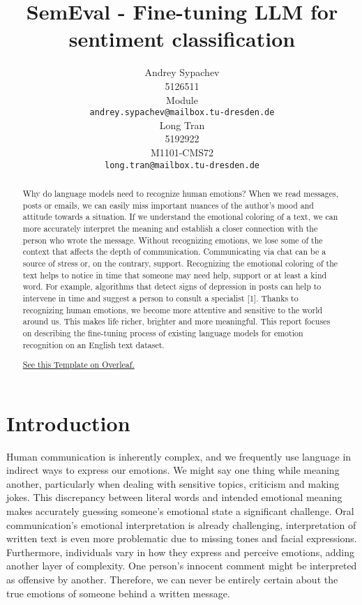\documentclass[11pt]{article}
\title{SemEval - Fine-tuning LLM for sentiment classification}
\author{Andrey Sypachev \\
  5126511\\
  Module \\
  \texttt{andrey.sypachev@mailbox.tu-dresden.de} 
  \\\And
  Long Tran \\
  5192922\\
  M1101-CMS72 \\
  \texttt{long.tran@mailbox.tu-dresden.de} 
  \\}
\begin{document}
\maketitle
\begin{abstract}
Why do language models need to recognize human emotions?
When we read messages, posts or emails, we can easily miss important nuances of the author's mood and attitude towards a situation. If we understand the emotional coloring of a text, we can more accurately interpret the meaning and establish a closer connection with the person who wrote the message. Without recognizing emotions, we lose some of the context that affects the depth of communication. Communicating via chat can be a source of stress or, on the contrary, support. Recognizing the emotional coloring of the text helps to notice in time that someone may need help, support or at least a kind word. For example, algorithms that detect signs of depression in posts can help to intervene in time and suggest a person to consult a specialist [1]. Thanks to recognizing human emotions, we become more attentive and sensitive to the world around us. This makes life richer, brighter and more meaningful.
This report focuses on describing the fine-tuning process of existing language models for emotion recognition on an English text dataset.

\href{https://www.overleaf.com/project/67469c50cdaee20b5e17b6e9}{See this Template on Overleaf.}
\end{abstract}

\section{Introduction}

Human communication is inherently complex, and we frequently use language in indirect ways to express our emotions. We might say one thing while meaning another, particularly when dealing with sensitive topics, criticism and making jokes. This discrepancy between literal words and intended emotional meaning makes accurately guessing someone's emotional state a significant challenge. Oral communication's emotional interpretation is already challenging, interpretation of written text is even more problematic due to missing tones and facial expressions. Furthermore, individuals vary in how they express and perceive emotions, adding another layer of complexity. One person's innocent comment might be interpreted as offensive by another. Therefore, we can never be entirely certain about the true emotions of someone behind a written message.
\end{document}
